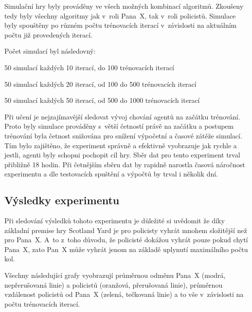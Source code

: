 Simulační hry byly prováděny ve všech možných kombinací algoritmů.
Zkoušeny tedy byly všechny algoritmy jak v~roli Pana~X, tak v~roli policistů.
Simulace byly spouštěny po různém počtu trénovacích iterací v~závislosti na aktuálním počtu již provedených iterací.\pagebreak

Počet simulací byl následovný:
\begin{myitemize}
  \item 50 simulací každých 10 iterací, do 100 trénovacích iterací
  \item 50 simulací každých 20 iterací, od 100 do 500 trénovacích iterací
  \item 50 simulací každých 50 iterací, od 500 do 1000 trénovacích iterací
\end{myitemize}

Při učení je nejzajímavější sledovat vývoj chování agentů na začátku trénování.
Proto byly simulace prováděny s~větší četností právě na začátku a postupem trénování byla četnost snižována pro snížení výpočetní a časové zátěže simulací.
Tím bylo zajištěno, že experiment správně a efektivně vyobrazuje jak rychle a jestli, agenti byly schopni pochopit cíl hry.
Sběr dat pro tento experiment trval přibližně 18 hodin.
Při četnějším sběru dat by rapidně narostla časová náročnost experimentu a dle testovacích spuštění a výpočtů by trval i několik dní.

\subsection{Výsledky experimentu}
\label{subsec:vysledky-experimentu-1}

Při sledování výsledků tohoto experimentu je důležité si uvědomit že díky základní premise hry Scotland Yard je pro policisty vyhrát mnohem složitější než pro Pana~X\@.
A~to z~toho důvodu, že  policisté dokážou vyhrát pouze pokud chytí Pana~X, zato Pan~X může vyhrát jenom na základě uplynutí maximálního počtu kol.

Všechny následující grafy vyobrazují průměrnou odměnu Pana~X (modrá, nepřerušovaná linie) a policistů (oranžová, přerušovaná linie), průměrnou vzdálenost policistů od Pana~X (zelená, tečkovaná linie) a to vše v~závislosti na počtu trénovacích iterací.

